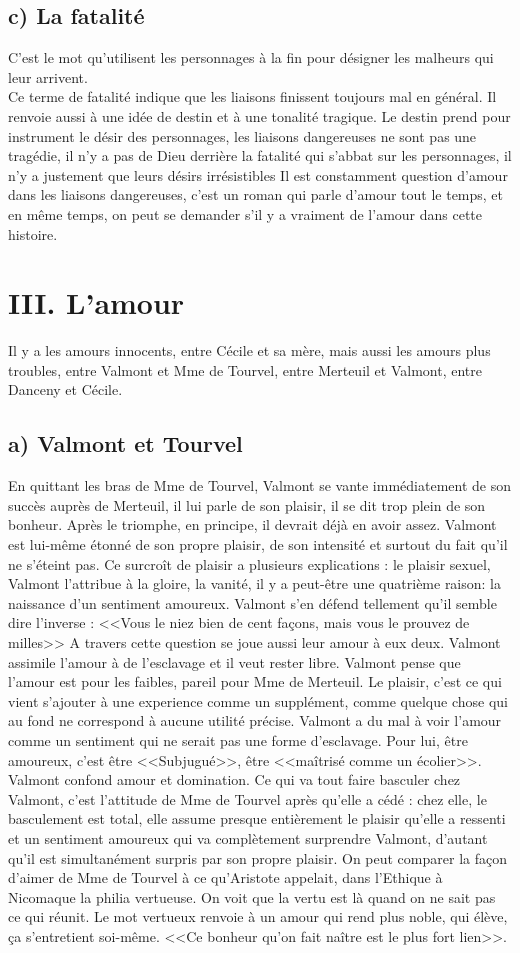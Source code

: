 \documentclass[12pt]{article}
\begin{document}
\subsection*{c) La fatalité} 
C'est le mot qu'utilisent les personnages à la fin pour désigner les malheurs qui leur arrivent.\\
Ce terme de fatalité indique que les liaisons finissent toujours mal en général.
Il renvoie aussi à une idée de destin et à une tonalité tragique.
Le destin prend pour instrument le désir des personnages, les liaisons dangereuses ne sont pas une tragédie, il n'y a pas de Dieu derrière la fatalité qui s'abbat sur les personnages, il n'y a justement que leurs désirs irrésistibles
Il est constamment question d'amour dans les liaisons dangereuses, c'est un roman qui parle d'amour tout le temps, et en même temps, on peut se demander s'il y a vraiment de l'amour dans cette histoire.
\section*{III. L'amour}
Il y a les amours innocents, entre Cécile et sa mère, mais aussi les amours plus troubles, entre Valmont et Mme de Tourvel, entre Merteuil et Valmont, entre Danceny et Cécile.
\subsection*{a) Valmont et Tourvel}
En quittant les bras de Mme de Tourvel, Valmont se vante immédiatement de son succès auprès de Merteuil, il lui parle de son plaisir, il se dit trop plein de son bonheur. Après le triomphe, en principe, il devrait déjà en avoir assez.
Valmont est lui-même étonné de son propre plaisir, de son intensité et surtout du fait qu'il ne s'éteint pas.
Ce surcroît de plaisir a plusieurs explications : le plaisir sexuel, Valmont l'attribue à la gloire, la vanité, il y a peut-être une quatrième raison: la naissance d'un sentiment amoureux. Valmont s'en défend tellement qu'il semble dire l'inverse : <<Vous le niez bien de cent façons, mais vous le prouvez de milles>>
A travers cette question se joue aussi leur amour à eux deux. Valmont assimile l'amour à de l'esclavage et il veut rester libre.
Valmont pense que l'amour est pour les faibles, pareil pour Mme de Merteuil. 
Le plaisir, c'est ce qui vient s'ajouter à une experience comme un supplément, comme quelque chose qui au fond ne correspond à aucune utilité précise.
Valmont a du mal à voir l'amour comme un sentiment qui ne serait pas une forme d'esclavage.
Pour lui, être amoureux, c'est être <<Subjugué>>, être <<maîtrisé comme un écolier>>.
Valmont confond amour et domination. Ce qui va tout faire basculer chez Valmont, c'est l'attitude de Mme de Tourvel après qu'elle a cédé : chez elle, le basculement est total, elle assume presque entièrement le plaisir qu'elle a ressenti et un sentiment amoureux qui va complètement surprendre Valmont, d'autant qu'il est simultanément surpris par son propre plaisir.
On peut comparer la façon d'aimer de Mme de Tourvel à ce qu'Aristote appelait, dans l'Ethique à Nicomaque la philia vertueuse. On voit que la vertu est là quand on ne sait pas ce qui réunit.
Le mot vertueux renvoie à un amour qui rend plus noble, qui élève, ça s'entretient soi-même.
<<Ce bonheur qu'on fait naître est le plus fort lien>>.
\end{document}

